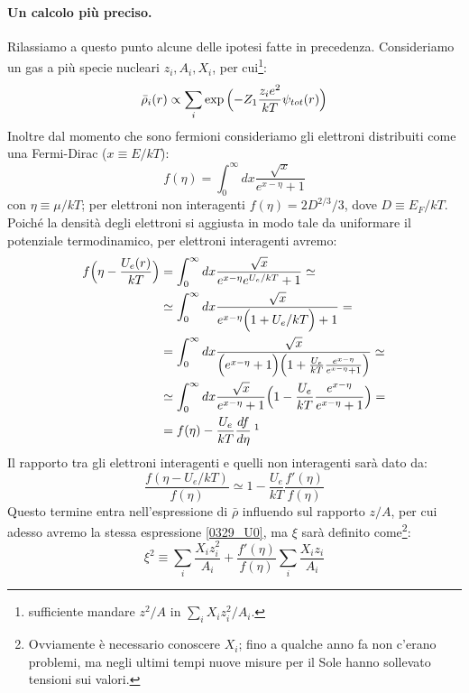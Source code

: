 \paragraph{Un calcolo più preciso.} Rilassiamo a questo punto alcune delle ipotesi fatte in precedenza. Consideriamo un gas a più specie nucleari $z_i, A_i, X_i$, per cui\footnote{ sufficiente mandare $z^2/A$ in $\sum_i X_iz^2_i/A_i$.}:
$$\bar{\rho}_i(r)\propto \sum_i \exp{\Bigl ( -Z_1 \frac{z_ie^2}{kT}\psi_{tot}(r) \Bigr )}$$
Inoltre dal momento che sono fermioni consideriamo gli elettroni distribuiti come una Fermi-Dirac ($x\equiv E/kT$):
$$f(\eta) = \int_0^\infty dx \frac{\sqrt{x}}{e^{x-\eta}+1}$$
con $\eta \equiv \mu/kT$; per elettroni non interagenti $f(\eta) = 2D^{2/3}/3$, dove $D\equiv E_F/kT$. Poiché la densità degli elettroni si aggiusta in modo tale da uniformare il potenziale termodinamico, per elettroni interagenti avremo:
\begin{displaymath}
\begin{aligned}
f\ppc{\eta - \frac{U_e(r)}{kT}} &= \int_0^\infty dx \frac{\sqrt{x}}{e^{x-\eta}e^{U_e/kT}+1} \simeq \\
&\simeq \int_0^\infty dx \frac{\sqrt{x}}{e^{x-\eta}\ppc{1+U_e/kT}+1} =\\
&= \int_0^\infty dx \frac{\sqrt{x}}{\ppc{e^{x-\eta}+1}\ppc{1+\frac{U_e}{kT}\frac{e^{x-\eta}}{e^{x-\eta}+1}}}\simeq \\
&\simeq \int_0^\infty dx \frac{\sqrt{x}}{e^{x-\eta}+1}\ppc{1-\frac{U_e}{kT}\frac{e^{x-\eta}}{e^{x-\eta}+1}} =\\
&= f(\eta) - \frac{U_e}{kT}\frac{df}{d\eta}\:\footnotemark
\end{aligned}
\end{displaymath}
\noindent Il rapporto tra gli elettroni interagenti e quelli non interagenti sarà dato da:
$$\frac{f(\eta-U_e/kT)}{f(\eta)} \simeq 1- \frac{U_e}{kT}\frac{f'(\eta)}{f(\eta)}$$
Questo termine entra nell'espressione di $\bar{\rho}$ influendo sul rapporto $z/A$, per cui adesso avremo la stessa espressione \eqref{0329_U0}, ma $\xi$ sarà definito come\footnote{Ovviamente è necessario conoscere $X_i$; fino a qualche anno fa non c'erano problemi, ma negli ultimi tempi nuove misure per il Sole hanno sollevato tensioni sui valori.}:
$$\xi^2 \equiv \sum_i\frac{X_iz_i^2}{A_i} + \frac{f'(\eta)}{f(\eta)}\sum_i\frac{X_iz_i}{A_i}$$


